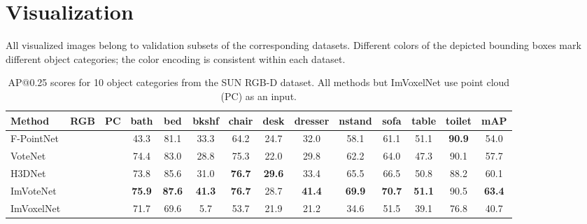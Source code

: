 \documentclass[10pt,twocolumn,letterpaper]{article}
\newcommand{\cmark}{\ding{51}}
\newcommand{\xmark}{\ding{55}}
\begin{document}
\section{Visualization} \label{sec:visualization}

All visualized images belong to validation subsets of the corresponding datasets. Different colors of the depicted bounding boxes mark different object categories; the color encoding is consistent within each dataset.

\begin{table*}[!ht]
    \centering \small
    \begingroup \setlength{\tabcolsep}{2pt}
    \begin{tabular}{l|cc|cccccccccc|c}
    \hline
    Method & RGB & PC & bath & bed & bkshf & chair & desk & dresser & nstand & sofa & table & toilet & mAP \\ \hline
    F-PointNet\cite{qi2018frustum} & \cmark & \cmark & 43.3 & 81.1 & 33.3 & 64.2 & 24.7 & 32.0 & 58.1 & 61.1 & 51.1 & \textbf{90.9} & 54.0 \\
    VoteNet\cite{qi2019votenet} & \xmark & \cmark & 74.4 & 83.0 & 28.8 & 75.3 & 22.0 & 29.8 & 62.2 & 64.0 & 47.3 & 90.1 & 57.7 \\
    H3DNet\cite{zhang2020h3dnet} & \xmark & \cmark & 73.8 & 85.6 & 31.0 & \textbf{76.7} & \textbf{29.6} & 33.4 & 65.5 & 66.5 & 50.8 & 88.2 & 60.1 \\
    ImVoteNet\cite{qi2020imvotenet} & \cmark & \cmark & \textbf{75.9} & \textbf{87.6} & \textbf{41.3} & \textbf{76.7} & 28.7 & \textbf{41.4} & \textbf{69.9} & \textbf{70.7} & \textbf{51.1} & 90.5 & \textbf{63.4} \\ \hline
    ImVoxelNet & \cmark & \xmark & 71.7 & 69.6 & \phantom{0}5.7 & 53.7 & 21.9 & 21.2 & 34.6 & 51.5 & 39.1 & 76.8 & 40.7 \\ \hline
    \end{tabular} \endgroup
    \caption{AP@0.25 scores for 10 object categories \cite{qi2019votenet} from the SUN RGB-D dataset. All methods but ImVoxelNet use point cloud (PC) as an input.}
    \label{tab:sunrgbd25}
\end{table*}
\end{document}
